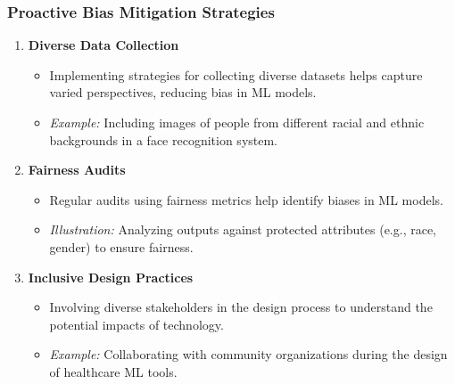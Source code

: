 \documentclass[aspectratio=169]{beamer}
\begin{document}
\begin{frame}[fragile]
    \frametitle{Proactive Bias Mitigation Strategies}
    \begin{enumerate}
        \item \textbf{Diverse Data Collection}
            \begin{itemize}
                \item Implementing strategies for collecting diverse datasets helps capture varied perspectives, reducing bias in ML models.
                \item \textit{Example:} Including images of people from different racial and ethnic backgrounds in a face recognition system.
            \end{itemize}
        
        \item \textbf{Fairness Audits}
            \begin{itemize}
                \item Regular audits using fairness metrics help identify biases in ML models.
                \item \textit{Illustration:} Analyzing outputs against protected attributes (e.g., race, gender) to ensure fairness.
            \end{itemize}
        
        \item \textbf{Inclusive Design Practices}
            \begin{itemize}
                \item Involving diverse stakeholders in the design process to understand the potential impacts of technology.
                \item \textit{Example:} Collaborating with community organizations during the design of healthcare ML tools.
            \end{itemize}
    \end{enumerate}
\end{frame}
\end{document}
